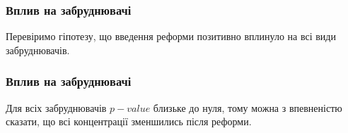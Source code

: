 \documentclass{beamer}
\begin{document}
\begin{frame}
  \frametitle{Вплив на забруднювачі}

  Перевіримо гіпотезу, що введення реформи позитивно вплинуло на всі види забруднювачів.

  
\end{frame}

\begin{frame}
  \frametitle{Вплив на забруднювачі}

  Для всіх забруднювачів $p-value$ близьке до нуля, тому можна з впевненістю сказати, що всі концентрації зменшились після реформи.
\end{frame}
\end{document}

